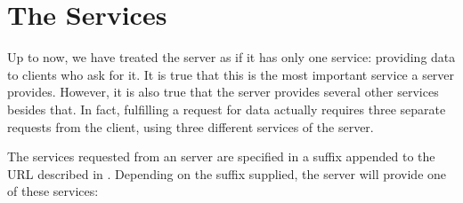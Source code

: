 \section{The \opendap Services}
\label{opd-client,services}

Up to now, we have treated the \opendap server as if it has only one
service: providing data to clients who ask for it.  It is true that
this is the most important service a server provides.  However, it is
also true that the server provides several other services besides
that.  In fact, fulfilling a request for data actually requires three
separate requests from the client, using three different services of
the \opendap server.

The services requested from an \opendap server are specified in a suffix
appended to the URL described in
.  Depending on the suffix
supplied, the server will provide one of these services:

